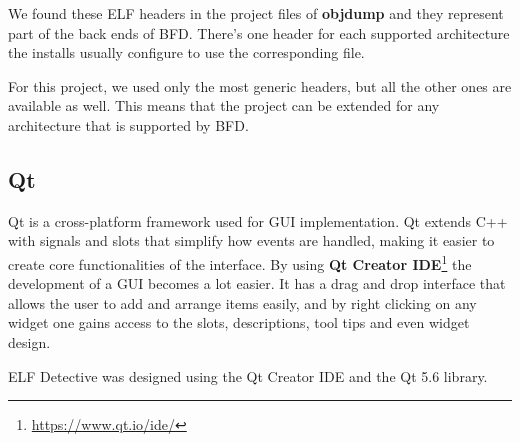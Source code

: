 We found these ELF headers in the project files of \textbf{objdump} and they represent part of the back ends of BFD. There's one header for each supported architecture the installs usually configure to use the corresponding file.

For this project, we used only the most generic headers, but all the other ones are available as well. This means that the project can be extended for any architecture that is supported by BFD.

\subsection{Qt}
\label{sub-sec:qt}

Qt is a cross-platform framework used for GUI implementation. Qt extends C++ with signals and slots that simplify how events are handled, making it easier to create core functionalities of the interface. By using \textbf{Qt Creator IDE}\footnote{\url{https://www.qt.io/ide/}} the development of a GUI becomes a lot easier. It has a drag and drop interface that allows the user to add and arrange items easily, and by right clicking on any widget one gains access to the slots, descriptions, tool tips and even widget design.

ELF Detective was designed using the Qt Creator IDE and the Qt 5.6 library.
